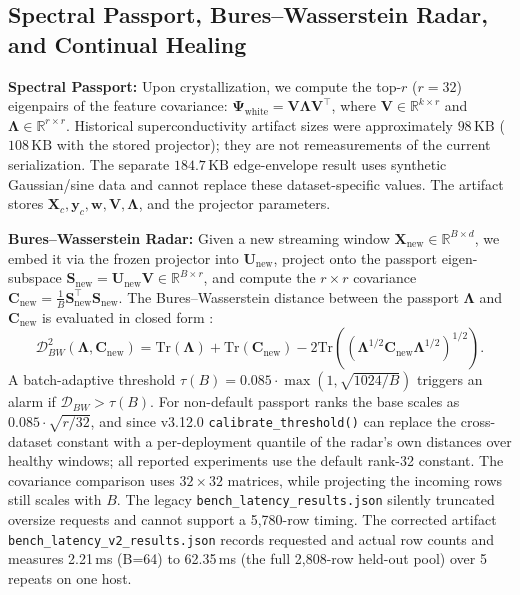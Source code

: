 \documentclass[11pt,a4paper]{article}
\begin{document}
\subsection{Spectral Passport, Bures--Wasserstein Radar, and Continual Healing}

\textbf{Spectral Passport:} Upon crystallization, we compute the top-$r$ ($r=32$) eigenpairs of the feature covariance: $\boldsymbol{\Psi}_{\text{white}} = \mathbf{V} \boldsymbol{\Lambda} \mathbf{V}^\top$, where $\mathbf{V} \in \mathbb{R}^{k \times r}$ and $\boldsymbol{\Lambda} \in \mathbb{R}^{r \times r}$. Historical superconductivity artifact sizes were approximately $98\,\mathrm{KB}$ ($108\,\mathrm{KB}$ with the stored projector); they are not remeasurements of the current serialization. The separate $184.7\,\mathrm{KB}$ edge-envelope result uses synthetic Gaussian/sine data and cannot replace these dataset-specific values. The artifact stores $\mathbf{X}_c, \mathbf{y}_c, \mathbf{w}, \mathbf{V}, \boldsymbol{\Lambda}$, and the projector parameters.

\textbf{Bures--Wasserstein Radar:} Given a new streaming window $\mathbf{X}_{\text{new}} \in \mathbb{R}^{B \times d}$, we embed it via the frozen projector into $\mathbf{U}_{\text{new}}$, project onto the passport eigen-subspace $\mathbf{S}_{\text{new}} = \mathbf{U}_{\text{new}} \mathbf{V} \in \mathbb{R}^{B \times r}$, and compute the $r \times r$ covariance $\mathbf{C}_{\text{new}} = \frac{1}{B} \mathbf{S}_{\text{new}}^\top \mathbf{S}_{\text{new}}$. The Bures--Wasserstein distance between the passport $\boldsymbol{\Lambda}$ and $\mathbf{C}_{\text{new}}$ is evaluated in closed form \citep{bhatia2019bures}:
\begin{equation}
    \mathcal{D}_{BW}^2(\boldsymbol{\Lambda}, \mathbf{C}_{\text{new}}) = \text{Tr}(\boldsymbol{\Lambda}) + \text{Tr}(\mathbf{C}_{\text{new}}) - 2 \text{Tr}\left(\left(\boldsymbol{\Lambda}^{1/2} \mathbf{C}_{\text{new}} \boldsymbol{\Lambda}^{1/2}\right)^{1/2}\right).
\end{equation}
A batch-adaptive threshold $\tau(B) = 0.085 \cdot \max(1, \sqrt{1024/B})$ triggers an alarm if $\mathcal{D}_{BW} > \tau(B)$. For non-default passport ranks the base scales as $0.085 \cdot \sqrt{r/32}$, and since v3.12.0 \texttt{calibrate\_threshold()} can replace the cross-dataset constant with a per-deployment quantile of the radar's own distances over healthy windows; all reported experiments use the default rank-32 constant. The covariance comparison uses $32 \times 32$ matrices, while projecting the incoming rows still scales with $B$. The legacy \texttt{bench\_latency\_results.json} silently truncated oversize requests and cannot support a 5,780-row timing. The corrected artifact \texttt{bench\_latency\_v2\_results.json} records requested and actual row counts and measures 2.21\,ms (B=64) to 62.35\,ms (the full 2{,}808-row held-out pool) over 5 repeats on one host.
\end{document}
